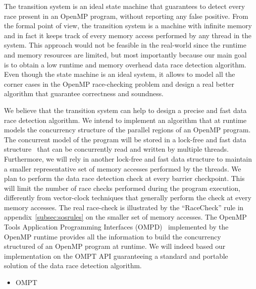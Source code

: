 The transition system is an ideal state machine that guarantees to detect
every race present in an OpenMP program, without reporting any false positive.
%
From the formal point of view, the transition system is a machine with
infinite memory and in fact it keeps track of every memory access performed by
any thread in the system.
%
This approach would not be feasible in the real-world since the runtime and
memory resources are limited, but most importantly because our main goal is to
obtain a low runtime and memory overhead data race detection algorithm.
%
Even though the state machine is an ideal system, it allows to model all the
corner cases in the OpenMP race-checking problem and design a real better
algorithm that guarantee correctness and soundness.

We believe that the transition system can help to design a precise and fast
data race detection algorithm.
%
We intend to implement an algorithm that at runtime models the concurrency
structure of the parallel regions of an OpenMP program.
%
The concurrent model of the program will be stored in a lock-free and fast
data structure~\cite{5871597, Matveev:2015:RLS:2815400.2815406} that can
be concurrently read and written by multiple threads.
%
Furthermore, we will rely in another lock-free and fast data structure to
maintain a smaller representative set of memory accesses performed by the
threads.
%
We plan to perform the data race detection check at every barrier checkpoint.
%
This will limit the number of race checks performed during the program
execution, differently from vector-clock techniques that generally perform the
check at every memory accesses.
%
The real race-check is illustrated by the ``RaceCheck'' rule in
appendix~\ref{subsec:sosrules} on the smaller set of memory accesses.
%
The OpenMP Tools Application Programming Interfaces (OMPD)~\cite{ompt}
implemented by the OpenMP runtime provides all the information to build the
concurrency structured of an OpenMP program at runtime.
%
We will indeed based our implementation on the OMPT API guaranteeing a
standard and portable solution of the data race detection algorithm.

\begin{itemize}
\item OMPT
\end{itemize}

